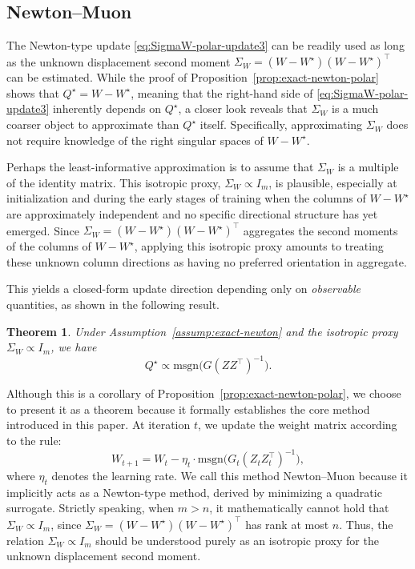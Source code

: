 \documentclass[11pt]{article}
\newtheorem{theorem}{Theorem}
\begin{document}
\subsection{Newton--Muon}

The Newton-type update \eqref{eq:SigmaW-polar-update3} can be readily used as long as the unknown displacement second moment $\Sigma_W = (W-W^\star)(W-W^\star)^\top$ can be estimated. While the proof of Proposition~\ref{prop:exact-newton-polar} shows that $Q^\star=W-W^\star$, meaning that the right-hand side of \eqref{eq:SigmaW-polar-update3} inherently depends on $Q^\star$, a closer look reveals that $\Sigma_W$ is a much coarser object to approximate than $Q^\star$ itself. Specifically, approximating $\Sigma_W$ does not require knowledge of the right singular spaces of $W-W^\star$.

Perhaps the least-informative approximation is to assume that $\Sigma_W$ is a multiple of the identity matrix. This isotropic proxy, ${\Sigma}_{{W}}\propto {I}_m$, is plausible, especially at initialization and during the early stages of training when the columns of $W - W^\star$ are approximately independent and no specific directional structure has yet emerged. Since ${\Sigma}_{{W}} = ({W}-W^\star)({W}-W^\star)^\top$ aggregates the second moments of the columns of ${W}-W^\star$, applying this isotropic proxy amounts to treating these unknown column directions as having no preferred orientation in aggregate. 

This yields a closed-form update direction depending only on \textit{observable} quantities, as shown in the following result.  

\begin{theorem}\label{thm:isotropic-sigma-newton-muon}
Under Assumption~\ref{assump:exact-newton} and the isotropic proxy ${\Sigma}_{{W}}\propto {I}_m$, we have
\[
{Q}^\star  \propto  \mathrm{msgn} \Big({G}({Z}{Z}^\top)^{-1}\Big).
\]
\end{theorem}

Although this is a corollary of Proposition~\ref{prop:exact-newton-polar}, we choose to present it as a theorem because it formally establishes the core method introduced in this paper. At iteration $t$, we update the weight matrix according to the rule:
\[
W_{t+1} = W_t - \eta_t \cdot \mathrm{msgn} \Big(G_t(Z_t Z_t^\top)^{-1}\Big),
\]
where $\eta_t$ denotes the learning rate. We call this method Newton--Muon because it implicitly acts as a Newton-type method, derived by minimizing a quadratic surrogate. Strictly speaking, when $m>n$, it mathematically cannot hold that ${\Sigma}_{{W}}\propto {I}_m$, since ${\Sigma}_{{W}}=({W}-W^\star)({W}-W^\star)^\top$ has rank at most $n$. Thus, the relation ${\Sigma}_{{W}}\propto {I}_m$ should be understood purely as an isotropic proxy for the unknown displacement second moment.
\end{document}
